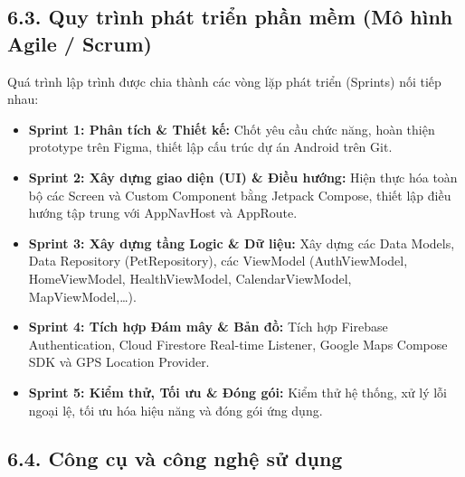\subsection*{6.3. Quy trình phát triển phần mềm (Mô hình Agile / Scrum)}
Quá trình lập trình được chia thành các vòng lặp phát triển (Sprints) nối tiếp nhau:
\begin{itemize}
    \item \textbf{Sprint 1: Phân tích \& Thiết kế:} Chốt yêu cầu chức năng, hoàn thiện prototype trên Figma, thiết lập cấu trúc dự án Android trên Git.
    \item \textbf{Sprint 2: Xây dựng giao diện (UI) \& Điều hướng:} Hiện thực hóa toàn bộ các Screen và Custom Component bằng Jetpack Compose, thiết lập điều hướng tập trung với AppNavHost và AppRoute.
    \item \textbf{Sprint 3: Xây dựng tầng Logic \& Dữ liệu:} Xây dựng các Data Models, Data Repository (PetRepository), các ViewModel (AuthViewModel, HomeViewModel, HealthViewModel, CalendarViewModel, MapViewModel,\dots).
    \item \textbf{Sprint 4: Tích hợp Đám mây \& Bản đồ:} Tích hợp Firebase Authentication, Cloud Firestore Real-time Listener, Google Maps Compose SDK và GPS Location Provider.
    \item \textbf{Sprint 5: Kiểm thử, Tối ưu \& Đóng gói:} Kiểm thử hệ thống, xử lý lỗi ngoại lệ, tối ưu hóa hiệu năng và đóng gói ứng dụng.
\end{itemize}

\subsection*{6.4. Công cụ và công nghệ sử dụng}

